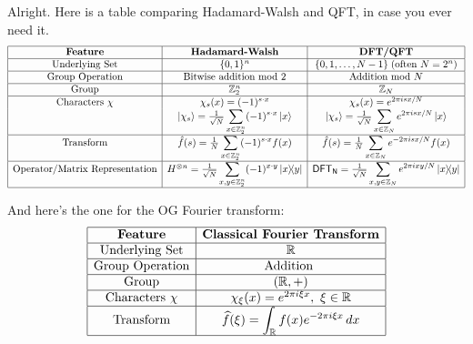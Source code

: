Alright. Here is a table comparing Hadamard-Walsh and QFT, in case you ever need it.
\[
\begin{array}{|c|c|c|}
\hline
\textbf{Feature} 
& \textbf{Hadamard-Walsh} 
& \textbf{DFT/QFT} \\
\hline

\text{Underlying Set} 
& \{0,1\}^n 
& \{0,1,\dots,N-1\}\; (\text{often } N=2^n) \\
\hline

\text{Group Operation} 
& \text{Bitwise addition mod 2} 
& \text{Addition mod } N \\
\hline

\text{Group} 
& \mathbb{Z}_2^n 
& \mathbb{Z}_N \\
\hline

\text{Characters } \chi 
& \chi_s(x)=(-1)^{s\cdot x} 
& \chi_s(x)=e^{2\pi i sx/N} \\

\text{}
& \ket{\chi_s} = \frac{1}{\sqrt{N}}\displaystyle\sum_{x \in \mathbb{Z}_2^n} (-1)^{s \cdot x}\ket{x}
& \ket{\chi_s} = \frac{1}{\sqrt{N}}\displaystyle\sum_{x \in \mathbb{Z}_N} e^{2\pi i sx/N} \ket{x} \\
\hline

\text{Transform}
& \hat{f}(s) = \frac{1}{N} \displaystyle\sum_{x \in \mathbb{Z}_2^n} (-1)^{s \cdot x} f(x)
& \hat{f}(s) = \frac{1}{N} \displaystyle\sum_{x \in \mathbb{Z}_N} e^{-2\pi i sx/N} f(x) \\
\hline

\text{Operator/Matrix Representation} 
& H^{\otimes n} = \frac{1}{\sqrt{N}} \displaystyle\sum_{x,y \in \mathbb{Z}_2^n} (-1)^{x \cdot y} \ketbra{x}{y}
& \mathsf{DFT_N} = \frac{1}{\sqrt{N}} \displaystyle\sum_{x,y \in \mathbb{Z}_N} e^{2\pi ixy/N} \ketbra{x}{y} \\
\hline

\end{array}
\]

And here's the one for the OG Fourier transform:
\[
\begin{array}{|c|c|}
\hline
\textbf{Feature} 
& \textbf{Classical Fourier Transform} \\
\hline

\text{Underlying Set} 
& \mathbb{R} \\
\hline

\text{Group Operation} 
& \text{Addition } \\
\hline

\text{Group} 
& (\mathbb{R}, +) \\
\hline

\text{Characters } \chi 
& \chi_\xi(x)=e^{2\pi i \xi x},\ \xi\in\mathbb{R} \\
\hline

\text{Transform} 
& \widehat f(\xi)=\displaystyle\int_{\mathbb R} 
f(x)e^{-2\pi i \xi x}\,dx \\
\hline

\end{array}
\]

